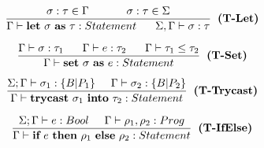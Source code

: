 \begin{minipage}[c]{0.1\textwidth}
\[
    \frac{\sigma : \tau \in \Gamma \hspace{1.2cm} \sigma : \tau \in \Sigma}
    {
        \Gamma\vdash \textbf{let} \ \sigma \ \textbf{as} \ \tau : Statement \hspace{0.6cm}\Sigma, \Gamma \vdash \sigma : \tau
    }
    \hspace{0.2cm} \textbf{(T-Let)}
\]
\end{minipage}
\hfill
\begin{minipage}[c]{0.45\textwidth}
\[
    \frac
    {\Gamma\vdash\sigma:\tau_1\hspace{0.6cm}\Gamma\vdash e:\tau_2\hspace{0.6cm}\Gamma\vdash\tau_1 \leq \tau_2}
    {\Gamma\vdash \textbf{set} \ \sigma \ \textbf{as} \ e : Statement} 
    \hspace{0.2cm} \textbf{(T-Set)}
\]
\end{minipage}
\hfill

\begin{minipage}[c]{0.5\textwidth}
\[
    \frac
    {
        \Sigma; \Gamma\vdash \sigma_1:\{B|P_1\}\hspace{0.5cm}\Gamma\vdash\sigma_2:\{B|P_2\}
    }
    {
        \Gamma\vdash \textbf{trycast} \ \sigma_1 \ \textbf{into} \ \tau_2 : Statement
    }
    \hspace{0.2cm} \textbf{(T-Trycast)}
\]
\end{minipage}\hfill
\begin{minipage}[c]{0.47\textwidth}
\[
    \frac
    {
        \Sigma; \Gamma\vdash e: Bool\hspace{0.5cm}\Gamma\vdash\rho_1, \rho_2: Prog
    }
    {
        \Gamma\vdash \textbf{if} \ e \ \textbf{then} \ \rho_1 \ \textbf{else} \ \rho_2 : Statement
    }
    \hspace{0.2cm} \textbf{(T-IfElse)}
\]
\end{minipage}


